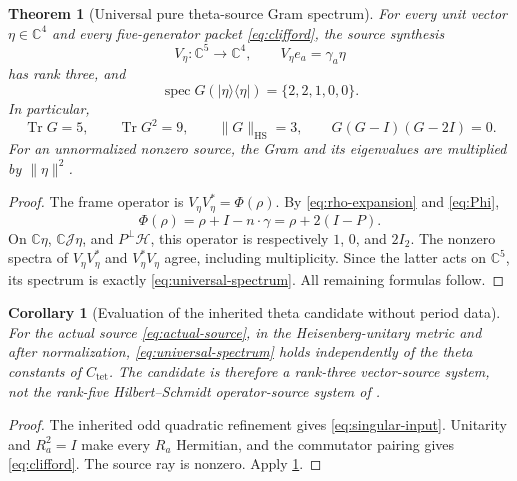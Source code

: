 \documentclass[11pt]{article}
\newtheorem{theorem}{Theorem}[section]
\newtheorem{corollary}[corollary]{Corollary}
\theoremstyle{definition}
\theoremstyle{remark}
\newcommand{\C}{\mathbb C}
\newcommand{\HH}{\mathcal H}
\newcommand{\Tr}{\operatorname{Tr}}
\newcommand{\spec}{\operatorname{spec}}
\newcommand{\HS}{\mathrm{HS}}
\newcommand{\norm}[1]{\lVert#1\rVert}
\newcommand{\ketbra}[1]{|#1\rangle\langle#1|}
\newcommand{\Jq}{\mathcal J}
\begin{document}
\begin{theorem}[Universal pure theta-source Gram spectrum]
\label{thm:pure-spectrum}
For every unit vector $\eta\in\C^4$ and every five-generator packet
\eqref{eq:clifford}, the source synthesis
\begin{equation}
 V_\eta:\C^5\longrightarrow\C^4,\qquad V_\eta e_a=\gamma_a\eta
 \label{eq:source-synthesis}
\end{equation}
has rank three, and
\begin{equation}
 \boxed{\spec G(\ketbra\eta)=\{2,2,1,0,0\}.}
 \label{eq:universal-spectrum}
\end{equation}
In particular,
\begin{equation}
 \Tr G=5,\qquad \Tr G^2=9,\qquad
 \norm G_{\HS}=3,
 \qquad G(G-I)(G-2I)=0.
 \label{eq:Gram-polynomial}
\end{equation}
For an unnormalized nonzero source, the Gram and its eigenvalues are multiplied
by $\norm\eta^2$.
\end{theorem}
\begin{proof}
The frame operator is $V_\eta V_\eta^*=\Phi(\rho)$. By
\eqref{eq:rho-expansion} and \eqref{eq:Phi},
\begin{equation}
 \Phi(\rho)=\rho+I-n\cdot\gamma
           =\rho+2(I-P).
 \label{eq:frame-operator}
\end{equation}
On $\C\eta$, $\C\Jq\eta$, and $P^\perp\HH$, this operator is respectively
$1$, $0$, and $2I_2$. The nonzero spectra of $V_\eta V_\eta^*$ and
$V_\eta^*V_\eta$ agree, including multiplicity. Since the latter acts on
$\C^5$, its spectrum is exactly \eqref{eq:universal-spectrum}. All remaining
formulas follow.
\end{proof}

\begin{corollary}[Evaluation of the inherited theta candidate without period data]
\label{cor:actual-theta}
For the actual source \eqref{eq:actual-source}, in the Heisenberg-unitary
metric and after normalization, \eqref{eq:universal-spectrum} holds
independently of the theta constants of $C_{\mathrm{tet}}$. The candidate is
therefore a rank-three vector-source system, not the rank-five
Hilbert--Schmidt operator-source system of \cite{AD9}.
\end{corollary}
\begin{proof}
The inherited odd quadratic refinement gives \eqref{eq:singular-input}.
Unitarity and $R_a^2=I$ make every $R_a$ Hermitian, and the commutator pairing
gives \eqref{eq:clifford}. The source ray is nonzero. Apply
\cref{thm:pure-spectrum}.
\end{proof}
\end{document}
